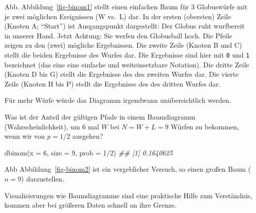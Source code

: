 \documentclass[
  a4paper,
  DIV=11]{scrreprt}
\newenvironment{Shaded}{\begin{snugshade}}{\end{snugshade}}
\newcommand{\AttributeTok}[1]{\textcolor[rgb]{0.40,0.45,0.13}{#1}}
\newcommand{\DecValTok}[1]{\textcolor[rgb]{0.68,0.00,0.00}{#1}}
\newcommand{\DocumentationTok}[1]{\textcolor[rgb]{0.37,0.37,0.37}{\textit{#1}}}
\newcommand{\FunctionTok}[1]{\textcolor[rgb]{0.28,0.35,0.67}{#1}}
\newcommand{\NormalTok}[1]{\textcolor[rgb]{0.00,0.23,0.31}{#1}}
\newcommand{\SpecialCharTok}[1]{\textcolor[rgb]{0.37,0.37,0.37}{#1}}
\theoremstyle{definition}
\theoremstyle{remark}
\begin{document}
Abb. Abbildung~\ref{fig-binom1} stellt einen einfachen Baum für 3
Globuswürfe mit je zwei möglichen Ereignissen (W vs.~L) dar. In der
ersten (obersten) Zeile (Knoten A; ``Start'') ist Ausgangspunkt
dargestellt: Der Globus ruht wurfbereit in unserer Hand. Jetzt Achtung:
Sie werfen den Globusball hoch. Die Pfeile zeigen zu den (zwei) mögliche
Ergebnissen. Die zweite Zeile (Knoten B und C) stellt die beiden
Ergebnisse des Wurfes dar. Die Ergebnisse sind hier mit \texttt{0} und
\texttt{1} bezeichnet (das eine eine einfache und weiteinsetzbare
Notation). Die dritte Zeile (Knoten D bis G) stellt die Ergebnisse des
des zweiten Wurfes dar. Die vierte Zeile (Knoten H bis P) stellt die
Ergebnisse des des dritten Wurfes dar.

Für mehr Würfe würde das Diagramm irgendwann unübersichtlich werden.

Was ist der Anteil der gültigen Pfade in einem Baumdiagramm
(Wahrscheinlichkeit), um 6 mal \(W\) bei \(N=W+L=9\) Würfen zu bekommen,
wenn wir von \(p=1/2\) ausgehen?

\begin{Shaded}
\begin{Highlighting}[]
\FunctionTok{dbinom}\NormalTok{(}\AttributeTok{x =} \DecValTok{6}\NormalTok{, }\AttributeTok{size =} \DecValTok{9}\NormalTok{, }\AttributeTok{prob =} \DecValTok{1}\SpecialCharTok{/}\DecValTok{2}\NormalTok{)}
\DocumentationTok{\#\# [1] 0.1640625}
\end{Highlighting}
\end{Shaded}

Abb Abbildung~\ref{fig-binom2} ist ein vergeblicher Versuch, so einen
großen Baum (\(n=9\)) darzustellen.

\begin{tcolorbox}[enhanced jigsaw, leftrule=.75mm, toptitle=1mm, bottomtitle=1mm, titlerule=0mm, breakable, colframe=quarto-callout-note-color-frame, title=\textcolor{quarto-callout-note-color}{\faInfo}\hspace{0.5em}{Hinweis}, rightrule=.15mm, colback=white, arc=.35mm, left=2mm, bottomrule=.15mm, coltitle=black, opacitybacktitle=0.6, toprule=.15mm, colbacktitle=quarto-callout-note-color!10!white, opacityback=0]
Visualisierungen wie Baumdiagramme sind eine praktische Hilfe zum
Verständnis, kommen aber bei größeren Daten schnell an ihre Grenze.
\end{tcolorbox}
\end{document}
